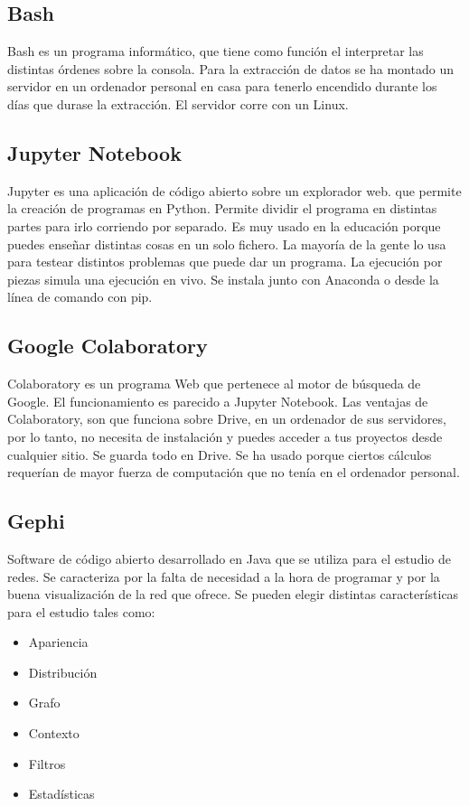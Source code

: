 \subsection{Bash}
Bash es un programa informático, que tiene como función el interpretar las distintas órdenes sobre la consola.
Para la extracción de datos se ha montado un servidor en un ordenador personal en casa para tenerlo encendido durante los días que durase la extracción. El servidor corre con un Linux.

\subsection{Jupyter Notebook}
Jupyter es una aplicación de código abierto sobre un explorador web. que permite la creación de programas en Python. Permite dividir el programa en distintas partes para irlo corriendo por separado. Es muy usado en la educación porque puedes enseñar distintas cosas en un solo fichero.
La mayoría de la gente lo usa para testear distintos problemas que puede dar un programa. La ejecución por piezas simula una ejecución en vivo.
Se instala junto con Anaconda o desde la línea de comando con pip.
\subsection{Google Colaboratory}
Colaboratory es un programa Web que pertenece al motor de búsqueda de Google. El funcionamiento es parecido a Jupyter Notebook. Las ventajas de Colaboratory, son que funciona sobre Drive, en un ordenador de sus servidores, por lo tanto, no necesita de instalación y puedes acceder a tus proyectos desde cualquier sitio. Se guarda todo en Drive.
Se ha usado porque ciertos cálculos requerían de mayor fuerza de computación que no tenía en el ordenador personal.

\subsection{Gephi}
Software de código abierto desarrollado en Java que se utiliza para el estudio de redes. Se caracteriza por la falta de necesidad a la hora de programar y por la buena visualización de la red que ofrece. 
Se pueden elegir distintas características para el estudio tales como:
\begin{itemize}
    \item Apariencia
    \item Distribución
    \item Grafo
    \item Contexto
    \item Filtros
    \item Estadísticas
\end{itemize}


